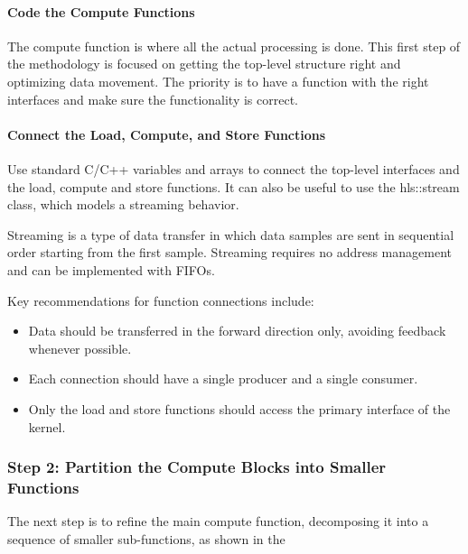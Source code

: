 \paragraph{Code the Compute Functions}
The compute function is where all the actual processing is done. This first step of the methodology is focused on getting the top-level structure right and optimizing data movement. The priority is to have a function with the right interfaces and make sure the functionality is
correct. 

\paragraph{Connect the Load, Compute, and Store Functions}
Use standard C/C++ variables and arrays to connect the top-level interfaces and the load, compute and store functions. It can also be useful to use the hls::stream class, which models a streaming behavior.

\par Streaming is a type of data transfer in which data samples are sent in sequential order starting from the first sample. Streaming requires no address management and can be implemented with FIFOs. 

\par Key recommendations for function connections include:
\begin{itemize}
    \item Data should be transferred in the forward direction only, avoiding feedback whenever possible.
    \item Each connection should have a single producer and a single consumer.
    \item Only the load and store functions should access the primary interface of the kernel.
\end{itemize}

\subsubsection{Step 2: Partition the Compute Blocks into Smaller Functions}
The next step is to refine the main compute function, decomposing it into a sequence of smaller sub-functions, as shown in the 

